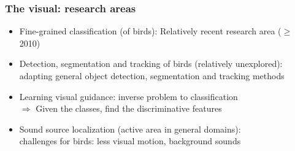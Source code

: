 \documentclass[mathserif]{beamer}
\begin{document}
\begin{frame}
\frametitle{The visual: research areas}
\begin{itemize}
\item<2-> Fine-grained classification (of birds): Relatively recent research area ($\geq$ 2010)
\item<3-> Detection, segmentation and tracking of birds (relatively unexplored): 
\\adapting general object detection, segmentation and tracking methods
\item<4-> Learning visual guidance: inverse problem to classification \\$\Rightarrow$ Given the classes, find the discriminative features
\item<5-> Sound source localization (active area in general domains): 
\\challenges for birds: less visual motion, background sounds
\end{itemize}
\end{frame}
\end{document}
